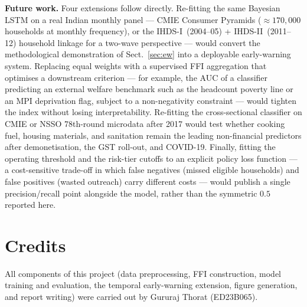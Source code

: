 \documentclass[colorlinks,balance]{asmeconf}
\begin{document}
\textbf{Future work.} Four extensions follow directly. Re-fitting the same Bayesian LSTM on a real Indian monthly panel --- CMIE Consumer Pyramids ($\approx\!170{,}000$ households at monthly frequency), or the IHDS-I~(2004--05) + IHDS-II~(2011--12) household linkage for a two-wave perspective --- would convert the methodological demonstration of Sect.~\ref{sec:ew} into a deployable early-warning system. Replacing equal weights with a supervised FFI aggregation that optimises a downstream criterion --- for example, the AUC of a classifier predicting an external welfare benchmark such as the headcount poverty line or an MPI deprivation flag, subject to a non-negativity constraint --- would tighten the index without losing interpretability. Re-fitting the cross-sectional classifier on CMIE or NSSO 78th-round microdata after 2017 would test whether cooking fuel, housing materials, and sanitation remain the leading non-financial predictors after demonetisation, the GST roll-out, and COVID-19. Finally, fitting the operating threshold and the risk-tier cutoffs to an explicit policy loss function --- a cost-sensitive trade-off in which false negatives (missed eligible households) and false positives (wasted outreach) carry different costs --- would publish a single precision/recall point alongside the model, rather than the symmetric $0.5$ reported here.

\clearpage
\section*{Credits}
All components of this project (data preprocessing, FFI construction, model training and evaluation, the temporal early-warning extension, figure generation, and report writing) were carried out by Gururaj Thorat (ED23B065).



\end{document}
